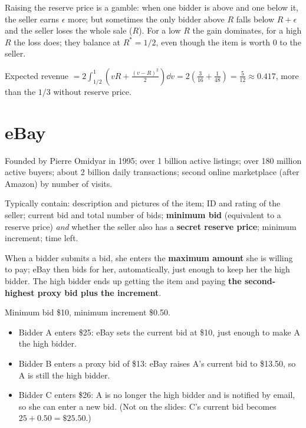 \documentclass[11pt,a4paper,openany]{book}
\begin{document}
\begin{rembox}[title=In plain words]
Raising the reserve price is a gamble: when one bidder is above and one below it, the seller
earns $\epsilon$ more; but sometimes the only bidder above $R$ falls below $R+\epsilon$ and
the seller loses the whole sale ($R$). For a low $R$ the gain dominates, for a high $R$ the
loss does; they balance at $R^* = 1/2$, even though the item is worth 0 to the seller.
\end{rembox}

\begin{exbox}[title={Revenue with $R = 1/2$ (not on the slides)}]
Expected revenue $= 2\int_{1/2}^{1}\left(vR + \frac{(v-R)^2}{2}\right)\dd v
= 2\left(\frac{3}{16} + \frac{1}{48}\right) = \frac{5}{12} \approx 0.417$, more than the $1/3$
without reserve price.
\end{exbox}


\section{eBay}

\begin{rembox}[title=Facts]
Founded by Pierre Omidyar in 1995; over 1 billion active listings; over 180 million active
buyers; about 2 billion daily transactions; second online marketplace (after Amazon) by number
of visits.
\end{rembox}

\begin{defnbox}[title=eBay listings]
Typically contain: description and pictures of the item; ID and rating of the seller; current
bid and total number of bids; \textbf{minimum bid} (equivalent to a reserve price) \emph{and}
whether the seller also has a \textbf{secret reserve price}; minimum increment; time left.
\end{defnbox}

\begin{defnbox}[title=Proxy bidding]
When a bidder submits a bid, she enters the \textbf{maximum amount} she is willing to pay;
eBay then bids for her, automatically, just enough to keep her the high bidder. The high
bidder ends up getting the item and paying \textbf{the second-highest proxy bid plus the
increment}.
\end{defnbox}

\begin{exbox}[title=Proxy bidding step by step]
Minimum bid \$10, minimum increment \$0.50.
\begin{itemize}
  \item Bidder A enters \$25: eBay sets the current bid at \$10, just enough to make A the
        high bidder.
  \item Bidder B enters a proxy bid of \$13: eBay raises A's current bid to \$13.50, so A is
        still the high bidder.
  \item Bidder C enters \$26: A is no longer the high bidder and is notified by email, so she
        can enter a new bid. (Not on the slides: C's current bid becomes $25 + 0.50 =
        \$25.50$.)
\end{itemize}
\end{exbox}
\end{document}
